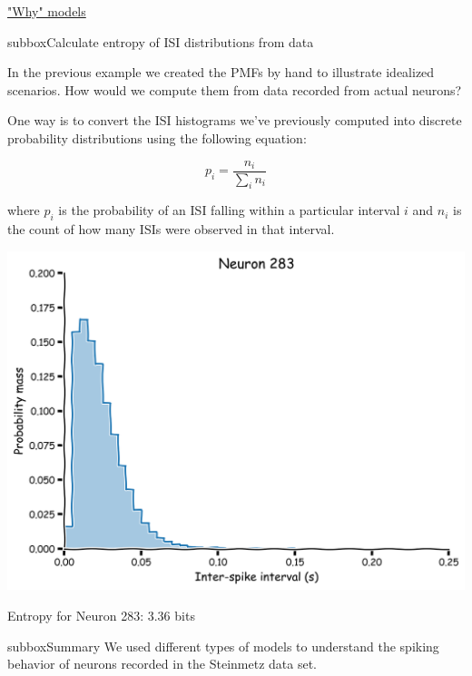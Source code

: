 \begin{textbox}{\href{https://compneuro.neuromatch.io/tutorials/W1D1_ModelTypes/student/W1D1_Tutorial3.html}{"Why" models } }


\begin{subbox}{subbox}{Calculate entropy of ISI distributions from data
}
\scriptsize


In the previous example we created the PMFs by hand to illustrate idealized scenarios. How would we compute them from data recorded from actual neurons?

One way is to convert the ISI histograms we've previously computed into discrete probability distributions using the following equation:

\begin{equation}
p_i = \frac{n_i}{\sum\nolimits_{i}n_i}
\end{equation}

where $p_i$ is the probability of an ISI falling within a particular interval $i$ and $n_i$ is the count of how many ISIs were observed in that interval.

\begin{center}
    
\includegraphics[scale=0.1]{Figures/MT/MT_Figure9.png}
\end{center}
Entropy for Neuron 283: 3.36 bits

\end{subbox}

\begin{subbox}{subbox}{Summary}
\scriptsize
We used different types of models to understand the spiking behavior of neurons recorded in the Steinmetz data set. 


\end{subbox}
\end{textbox}
